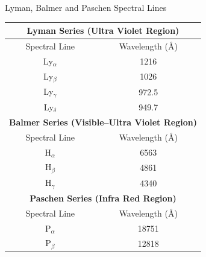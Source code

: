 \documentclass[aspectratio=1610,xcolor=dvipsnames,t]{beamer}
\begin{document}
    \begin{frame}{Lyman, Balmer and Paschen Spectral Lines} 


     \begin{table}
        \centering
        \centering
        \begin{tabular}{cc} \hline 
            \multicolumn{2}{c}{\bf Lyman Series (Ultra Violet Region)} \\ \hline 
            Spectral Line & Wavelength (\AA) \\ \hline 
            Ly$_{\alpha}$     &   1216    \\ 
            Ly$_{\beta}$      &   1026    \\ 
            Ly$_{\gamma}$     &   972.5   \\
            Ly$_{\delta}$    &   949.7   \\ \hline 

            \multicolumn{2}{c}{\bf Balmer Series (Visible--Ultra Violet Region)} \\ \hline 
            Spectral Line & Wavelength (\AA) \\ \hline 
            H$_{\alpha}$     &   6563    \\ 
            H$_{\beta}$      &   4861    \\ 
            H$_{\gamma}$     &   4340   \\ \hline 

            \multicolumn{2}{c}{\bf Paschen Series (Infra Red Region)} \\ \hline 
            Spectral Line & Wavelength (\AA) \\ \hline 
            P$_{\alpha}$     &   18751    \\ 
            P$_{\beta}$      &   12818    \\  \hline

        \end{tabular}
    \end{table} 
    \end{frame} 

\end{document}
